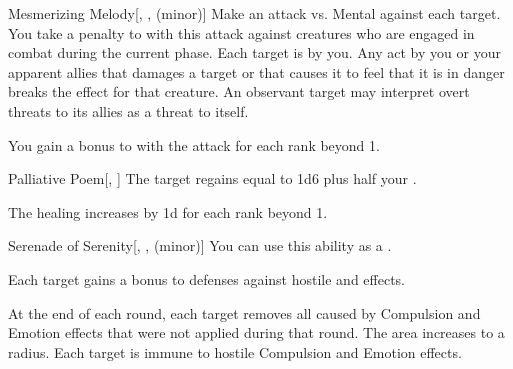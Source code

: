 {            \begin{freeability}{Mesmerizing Melody}[, ,  (minor)]
                Make an attack vs. Mental against each target.
                You take a  penalty to  with this attack against creatures who are engaged in combat during the current phase.
                \hit Each target is \fascinated by you.
                Any act by you or your apparent allies that damages a target or that causes it to feel that it is in danger breaks the effect for that creature.
                An observant target may interpret overt threats to its allies as a threat to itself.

                \rankline
                You gain a  bonus to  with the attack for each rank beyond 1.
            \end{freeability}

            \begin{freeability}{Palliative Poem}[, ]
                The target regains  equal to 1d6 plus half your .

                \rankline
                The healing increases by \plus1d for each rank beyond 1.
            \end{freeability}

            \begin{freeability}{Serenade of Serenity}[, ,  (minor)]
                You can use this ability as a .

                Each target gains a  bonus to defenses against hostile  and  effects.

                \rankline
                 At the end of each round, each target removes all  caused by Compulsion and Emotion effects that were not applied during that round.
                 The area increases to a \areahuge radius.
                 Each target is immune to hostile Compulsion and Emotion effects.
            \end{freeability}

}
